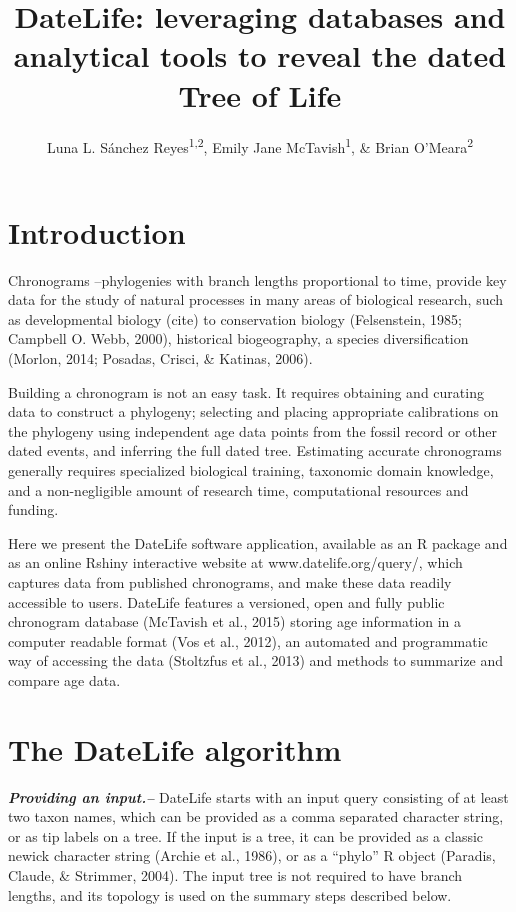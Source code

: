 \documentclass[
  english,
  man]{apa6}
\title{DateLife: leveraging databases and analytical tools to reveal the dated Tree of Life}
\author{Luna L. Sánchez Reyes\textsuperscript{1,2}, Emily Jane McTavish\textsuperscript{1}, \& Brian O'Meara\textsuperscript{2}}
\date{}
\affiliation{\vspace{0.5cm}\textsuperscript{1} University of California, Merced\\\textsuperscript{2} University of Tennessee, Knoxville}
\begin{document}
\maketitle

\hypertarget{introduction}{%
\section{Introduction}\label{introduction}}

Chronograms --phylogenies with branch lengths proportional to time, provide key data for the study of natural processes in many areas of biological research, such as developmental biology (cite) to conservation biology (Felsenstein, 1985; Campbell O. Webb, 2000), historical biogeography, a species diversification (Morlon, 2014; Posadas, Crisci, \& Katinas, 2006).

Building a chronogram is not an easy task.
It requires obtaining and curating data to construct a phylogeny; selecting and placing appropriate calibrations on the phylogeny using independent age data points from the fossil record or other dated events, and inferring the full dated tree.
Estimating accurate chronograms generally requires specialized biological training, taxonomic domain knowledge, and a non-negligible amount of research time, computational resources and funding.

Here we present the DateLife software application, available as an R package and as an online Rshiny interactive website at www.datelife.org/query/, which captures data from published chronograms, and make these data readily accessible to users.
DateLife features a versioned, open and fully public chronogram database (McTavish et al., 2015) storing age information in a computer readable format (Vos et al., 2012), an automated and programmatic way of accessing the data (Stoltzfus et al., 2013) and methods to summarize and compare age data.

\hypertarget{the-datelife-algorithm}{%
\section{The DateLife algorithm}\label{the-datelife-algorithm}}

\emph{\textbf{Providing an input.--}} DateLife starts with an input query consisting of at least two taxon names, which can be provided as a comma separated character string, or as tip labels on a tree. If the input is a tree, it can be provided as a classic newick character string (Archie et al., 1986), or as a ``phylo'' R object (Paradis, Claude, \& Strimmer, 2004). The input tree is not required to have branch lengths, and its topology is used on the summary steps described below.
\end{document}
